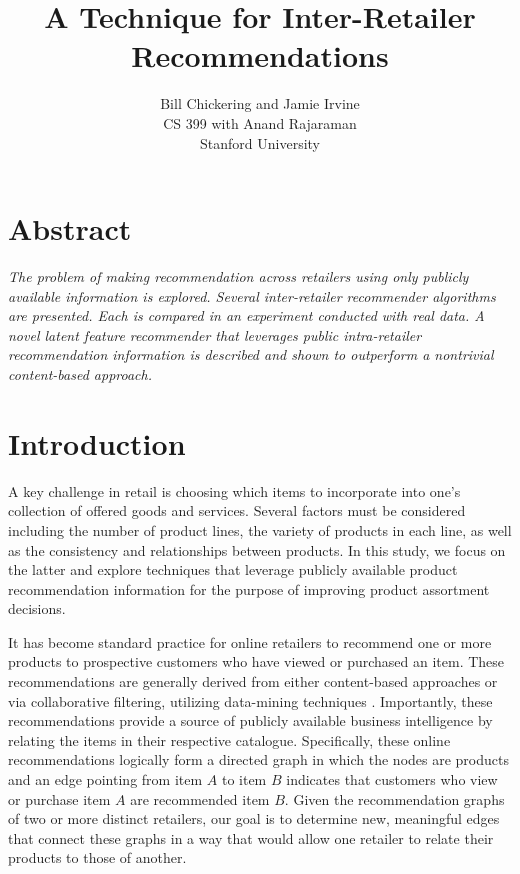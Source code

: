 \documentclass[11pt]{article}
\begin{document}

\title{A Technique for Inter-Retailer Recommendations}
\author{Bill Chickering and Jamie Irvine\\
CS 399 with Anand Rajaraman\\
Stanford University}
\renewcommand{\today}{June 11, 2014}
\maketitle

\section*{Abstract}
\emph{The problem of making recommendation across retailers using only publicly
available information is explored. Several inter-retailer recommender algorithms
are presented. Each is compared in an experiment conducted with real data. A 
novel latent feature recommender that leverages public intra-retailer
recommendation information is described and shown to outperform a nontrivial
content-based approach.}

\section*{Introduction}
A key challenge in retail is choosing which items to incorporate into one's
collection of offered goods and services.  Several factors must be considered
including the number of product lines, the variety of products in each line, as
well as the consistency and relationships between products. In this study, we
focus on the latter and explore techniques that leverage publicly available
product recommendation information for the purpose of improving product
assortment decisions.

It has become standard practice for online retailers to recommend one or more
products to prospective customers who have viewed or purchased an item. These
recommendations are generally derived from either content-based approaches or
via collaborative filtering, utilizing data-mining techniques \cite{Ricci2011}.
Importantly, these recommendations provide a source of publicly available
business intelligence by relating the items in their respective catalogue.
Specifically, these online recommendations logically form a directed graph in
which the nodes are products and an edge pointing from item $A$ to item $B$
indicates that customers who view or purchase item $A$ are recommended item $B$.
Given the recommendation graphs of two or more distinct retailers, our goal is
to determine new, meaningful edges that connect these graphs in a way that would
allow one retailer to relate their products to those of another.
\end{document}
